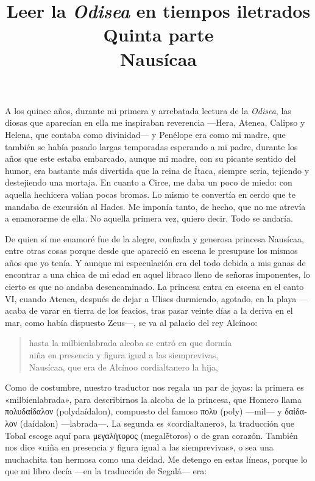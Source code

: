 \documentclass[11pt,a4paper]{article}
\title{Leer la \emph{Odisea} en tiempos iletrados \\ Quinta parte \\ Nausícaa}
\author{}
\date{}
\newcommand{\gr}[1]{\foreignlanguage{greek}{#1}}
\begin{document}
\maketitle

A los quince años, durante mi primera y arrebatada lectura de la \emph{Odisea}, las diosas que aparecían en ella me inspiraban reverencia ---Hera, Atenea, Calipso y Helena, que contaba como divinidad--- y Penélope era como mi madre, que también se había pasado largas temporadas esperando a mi padre, durante los años que este estaba embarcado, aunque mi madre, con su picante sentido del humor, era bastante más divertida que la reina de Ítaca, siempre seria, tejiendo y destejiendo una mortaja. En cuanto a Circe, me daba un poco de miedo: con aquella hechicera valían pocas bromas. Lo mismo te convertía en cerdo que te mandaba de excursión al Hades. Me imponía tanto, de hecho, que no me atrevía a enamorarme de ella. No aquella primera vez, quiero decir. Todo se andaría.

De quien sí me enamoré fue de la alegre, confiada y generosa princesa Nausícaa, entre otras cosas porque desde que apareció en escena le presupuse los mismos años que yo tenía. Y aunque mi especulación era del todo debida a mis ganas de encontrar a una chica de mi edad en aquel libraco lleno de señoras imponentes, lo cierto es que no andaba desencaminado. La princesa entra en escena en el canto VI, cuando Atenea, después de dejar a Ulises durmiendo, agotado, en la playa ---acaba de varar en tierra de los feacios, tras pasar veinte días a la deriva en el mar, como había dispuesto Zeus---, se va al palacio del rey Alcínoo:

\begin{verse}
hasta la milbienlabrada alcoba se entró en que dormía\\
niña en presencia y figura igual a las siemprevivas,\\
Nausícaa, que era de Alcínoo cordialtanero la hija,
\end{verse}

Como de costumbre, nuestro traductor nos regala un par de joyas: la primera es «milbienlabrada», para describirnos la alcoba de la princesa, que Homero llama \gr{πολυδαίδαλον} (polydaídalon), compuesto del famoso \gr{πολυ} (poly) ---mil--- y \gr{δαίδαλον} (daídalon) ---labrada---. La segunda es «cordialtanero», la traducción que Tobal escoge aquí para \gr{μεγαλήτορος} (megalḗtoros) o de gran corazón. También nos dice «niña en presencia y figura igual a las siemprevivas», o sea una muchachita tan hermosa como una deidad. Me detengo en estas líneas, porque lo que mi libro decía ---en la traducción de Segalá--- era:
\end{document}
